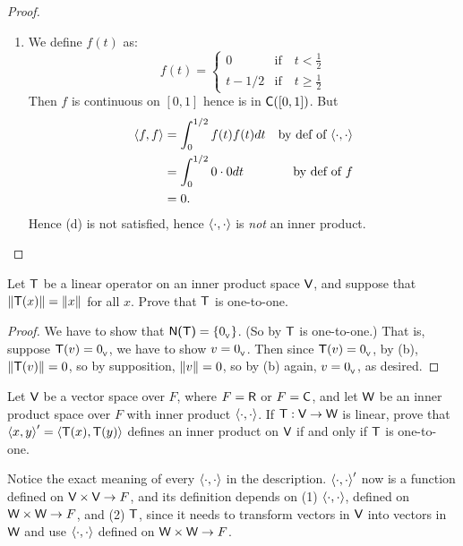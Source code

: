 \begin{proof}
\begin{enumerate}
\item
We define \(f(t)\) as:
\begin{equation*}
    f(t) = \begin{cases}
        0 & \text{if} \quad t < \frac{1}{2} \\
        t - 1/2 & \text{if} \quad t \ge \frac{1}{2}
    \end{cases}
\end{equation*}
Then \(f\) is continuous on \([0, 1]\) hence is in \(\textsf{C}([0, 1])\).
But
\begin{align*}
    \left< f, f \right> & = \int_0^{1/2} f(t) f(t) dt & \text{by def of \(\left<\cdot, \cdot \right>\)} \\
        & = \int_0^{1/2} 0 \cdot 0 dt & \text{by def of \(f\)} \\
        & = 0.
\end{align*}
Hence (d) is not satisfied, hence \(\left< \cdot, \cdot \right>\) is \emph{not} an inner product.
\end{enumerate}
\end{proof}

\begin{exercise} \label{exercise 6.1.17}
Let \(\textsf{T}\) be a linear operator on an inner product space \(\textsf{V}\), and suppose that \(\left\lVert\textsf{T}(x)\right\rVert = \left\lVert x\right\rVert\) for all \(x\).
Prove that \(\textsf{T}\) is one-to-one.
\end{exercise}

\begin{proof}
We have to show that \(\textsf{N(T)} = \{ 0_{_{\textsf{V}}} \}\).
(So by  \(\textsf{T}\) is one-to-one.)
That is, suppose \(\textsf{T}(v) = 0_{_{\textsf{V}}}\), we have to show \(v = 0_{_{\textsf{V}}}\).
Then since \(\textsf{T}(v) = 0_{_{\textsf{V}}}\), by (b), \(\left\lVert\textsf{T}(v)\right\rVert = 0\), so by supposition, \(\left\lVert v\right\rVert = 0\), so by (b) again, \(v = 0_{_{\textsf{V}}}\), as desired.
\end{proof}

\begin{exercise} \label{exercise 6.1.18}
Let \(\textsf{V}\) be a vector space over \(F\), where \(F = \textsf{R}\) or \(F = \textsf{C}\), and let \(\textsf{W}\) be an inner product space over \(F\) with inner product \(\left< \cdot, \cdot \right>\).
If \(\textsf{T} : \textsf{V} \to \textsf{W}\) is linear, prove that \(\left< x, y \right>' = \left< \textsf{T}(x), \textsf{T}(y) \right>\) defines an inner product on \(\textsf{V}\) if and only if \(\textsf{T}\) is one-to-one.
\end{exercise}

\begin{note}
Notice the exact meaning of every \(\left< \cdot, \cdot \right>\) in the description.
\(\left< \cdot, \cdot \right>'\) now is a function defined on \(\textsf{V} \times \textsf{V} \to F\), and its definition depends on (1) \(\left< \cdot, \cdot \right>\), defined on \(\textsf{W} \times \textsf{W} \to F\), and (2) \(\textsf{T}\), since it needs to transform vectors in \(\textsf{V}\) into vectors in \(\textsf{W}\) and use \(\left< \cdot, \cdot \right>\) defined on \(\textsf{W} \times \textsf{W} \to F\).
\end{note}

